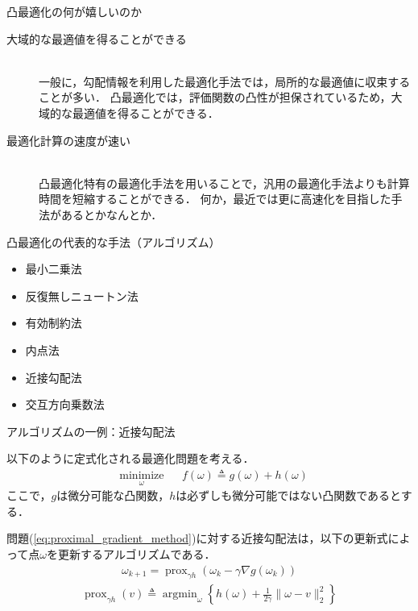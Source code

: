 \documentclass[aspectratio=169, dvipdfmx, 10.5pt]{beamer} %
\DeclareMathOperator{\minimize}{minimize}
\DeclareMathOperator{\argmin}{argmin}
\DeclareMathOperator{\prox}{prox}
\begin{document}
\begin{frame}{凸最適化の何が嬉しいのか}
    \begin{description}
        \item [大域的な最適値を得ることができる]~\\
        一般に，勾配情報を利用した最適化手法では，局所的な最適値に収束することが多い．
        凸最適化では，評価関数の凸性が担保されているため，大域的な最適値を得ることができる．
        \vspace{\baselineskip}
        \item [最適化計算の速度が速い]~\\
        凸最適化特有の最適化手法を用いることで，汎用の最適化手法よりも計算時間を短縮することができる．
        何か，最近では更に高速化を目指した手法があるとかなんとか．
    \end{description}
\end{frame}

\begin{frame}{凸最適化の代表的な手法（アルゴリズム）}
    \begin{itemize}
        \item 最小二乗法
        \item 反復無しニュートン法
        \item 有効制約法
        \item 内点法
        \item 近接勾配法
        \item 交互方向乗数法
    \end{itemize}
\end{frame}

\begin{frame}{アルゴリズムの一例：近接勾配法}
    \begin{screen}
        以下のように定式化される最適化問題を考える．
        \begin{align}
            \label{eq:proximal_gradient_method}
            & && \underset{\omega}{\minimize} && f(\omega) \triangleq g(\omega) + h(\omega) &&
        \end{align}
        ここで，$g$は微分可能な凸関数，$h$は必ずしも微分可能ではない凸関数であるとする．
    \end{screen}
    問題(\ref{eq:proximal_gradient_method})に対する近接勾配法は，以下の更新式によって点$\omega$を更新するアルゴリズムである．
    \begin{align*}
        \omega_{k+1} = \prox_{\gamma h} \left(\omega_k - \gamma \nabla g(\omega_k)\right)
    \end{align*}
    \begin{align*}
       \prox_{\gamma h} (v) \triangleq \argmin_{\omega} \left\{h(\omega) + \frac{1}{2\gamma} \| \omega - v \|_2^2 \right\}
    \end{align*}
\end{frame}
\end{document}
